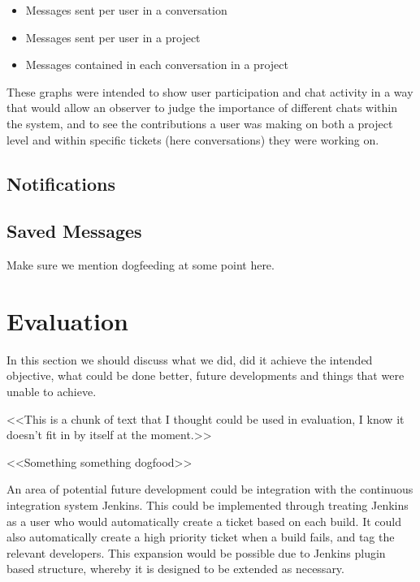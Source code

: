 \documentclass[a4paper]{l3proj}
\begin{document}
\begin{itemize}
\item Messages sent per user in a conversation
\item Messages sent per user in a project
\item Messages contained in each conversation in a project
\end{itemize}

These graphs were intended to show user participation and chat activity in a way that would allow an observer to judge the importance of different chats within the system, and to see the contributions a user was making on both a project level and within specific tickets (here conversations) they were working on.	

\section{Notifications}


\section{Saved Messages}

Make sure we mention dogfeeding at some point here.

\chapter{Evaluation}

In this section we should discuss what we did, did it achieve the intended objective, what could be done better, 
future developments and things that were unable to achieve.

<<This is a chunk of text that I thought could be used in evaluation, I know it doesn't fit in by itself at the moment.>>

<<Something something dogfood>>

An area of potential future development could be integration with the continuous integration system Jenkins.  This could be implemented through treating Jenkins as a user who would automatically create a ticket based on each build.  It could also automatically create a high priority ticket when a build fails, and tag the relevant developers.  This expansion would be possible due to Jenkins plugin based structure, whereby it is designed to be extended as necessary.
\end{document}
